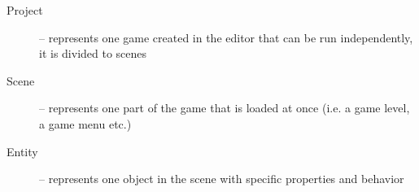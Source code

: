 \begin{description}
  \item[Project] -- represents one game created in the editor that can be run independently, it is divided to scenes
  \item[Scene] -- represents one part of the game that is loaded at once (i.e. a game level, a game menu etc.)
  \item[Entity] -- represents one object in the scene with specific properties and behavior
\end{description}